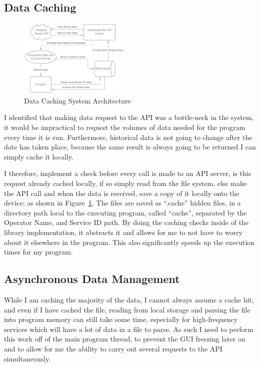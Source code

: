 \documentclass{article}
\begin{document}
\subsection{Data Caching}

\begin{figure}[H]
	\centering
	\includegraphics[width=200px]{images/data-diagram2.png}
	\caption{Data Caching System Architecture}
	\label{fig:cachingsystem}
\end{figure}


I identified that making data request to the API was a bottle-neck in the system, it would be impractical to request the volumes of data needed for the program every time it is run. Furthermore, historical data is not going to change after the date has taken place, because the same result is always going to be returned I can simply cache it locally. 



\par 
I therefore, implement a check before every call is made to an API server, is this request already cached locally, if so simply read from the file system, else make the API call and when the data is received, save a copy of it locally onto the device; as shown in Figure~\ref{fig:cachingsystem}.  The files are saved as ``.cache'' hidden files, in a directory path local to the executing program, called ``cache'', separated by the Operator Name, and Service ID path. By doing the caching checks inside of the library implementation, it abstracts it and allows for me to not have to worry about it elsewhere in the program. This also significantly speeds up the execution times for my program. 

\subsection{Asynchronous Data Management}
While I am caching the majority of the data, I cannot always assume a cache hit, and even if I have cached the file, reading from local storage and parsing the file into program memory can still take some time, especially for high-frequency services which will have a lot of data in a file to parse. As such I need to perform this work off of the main program thread, to prevent the GUI freezing later on and to allow for me the ability to carry out several requests to the API simultaneously.  
\end{document}
